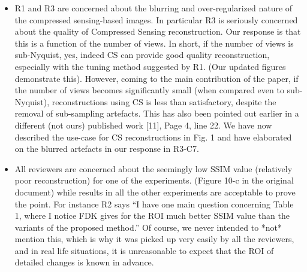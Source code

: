 \documentclass{article}
\begin{document}
\begin{itemize}
  \item R1 and R3 are concerned about the blurring and over-regularized nature of the compressed sensing-based images.  In particular R3 is seriously concerned about the quality of Compressed Sensing reconstruction. Our response is that this is a function of the number of views. In short, if the number of views is sub-Nyquist, yes, indeed CS can provide good quality reconstruction, especially with the tuning method suggested by R1. (Our updated figures demonstrate this). 
However,  coming to the main contribution of the paper, if the number of views becomes significantly small (when compared even to sub-Nyquist), reconstructions using CS is less than satisfactory, despite the removal of sub-sampling artefacts. This has also been pointed out earlier in a different (not ours) published work [11], Page 4, line 22.  We have now described the use-case for CS reconstructions in Fig. 1 and have elaborated on the blurred artefacts in our  response in R3-C7.
\item All reviewers are concerned about the seemingly low SSIM value (relatively poor reconstruction) for one of the experiments.  (Figure 10-c in the original document) while results in all the other experiments are acceptable to prove the point.  For instance R2 says ``I have one main question concerning Table 1, where I notice FDK gives for the ROI much better SSIM value than the variants of the proposed method.''  
Of course, we never intended to *not* mention this, which is why it was picked up very easily by all the reviewers, and in real life situations, it is unreasonable to expect that the ROI of detailed changes is known in advance. 


\end{itemize}
\end{document}
